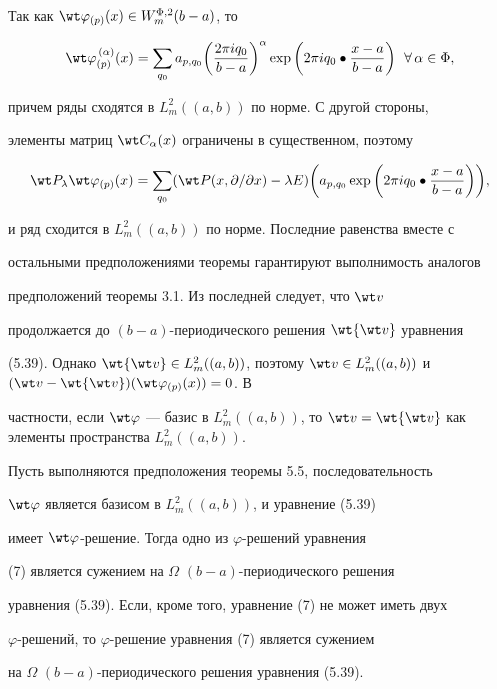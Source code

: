 \begin{pf} 


Так как $\wt\varphi_{(p)}(x)\in W^{\Phi,2}_m(b-a)$, то 


$$ 


\wt\varphi^{\,(\alpha)}_{(p)}(x)=\sum_{q_0} 


a_{p,q_0}\bigg(\frac{2\pi i q_0}{b-a}\bigg)^\alpha\exp\bigg( 


2\pi i q_0\bullet\frac{x-a}{b-a}\bigg)\ \; \forall\,\alpha\in\Phi, 


$$ 


причем ряды сходятся в $L^2_m((a,b))$ по норме. С другой стороны, 


элементы матриц $\wt C_\alpha(x)$ ограничены в существенном, поэтому 


$$ 


\wt P_\lambda\wt\varphi_{(p)}(x)=\sum_{q_0}(\wt P 


(x,\partial/\partial x)-\lambda E)\bigg(a_{p,q_0}\exp\bigg( 


2\pi i q_0\bullet\frac{x-a}{b-a}\bigg)\bigg), 


$$ 


и ряд сходится в $L^2_m((a,b))$ по норме. Последние равенства вместе с 


остальными предположениями теоремы гарантируют выполнимость аналогов 


предположений теоремы 3.1. Из последней следует, что $\wt v$ 


продолжается до $(b{-}a)$-периодического решения $\wt{\wt v}$ уравнения 


(5.39). Однако $\wt{\wt v}\in L^2_m((a,b))$, поэтому $\wt v\in 


L^2_m((a,b))$ и $(\wt v-\wt{\wt v})(\wt\varphi_{(p)}(x))=0$. В 


частности, если $\wt\varphi$ --- базис в $L^2_m((a,b))$, то $\wt 


v=\wt{\wt v}$ как элементы пространства $L^2_m((a,b))$. 


\end{pf} 


 


\begin{cors} 


Пусть выполняются предположения теоремы 5.5, последовательность 


$\wt\varphi$ является базисом в $L^2_m((a,b))$, и уравнение (5.39) 


имеет $\wt\varphi$-решение. Тогда одно из $\varphi$-решений уравнения 


(7) является сужением на $\Omega$\; $(b{-}a)$-периодического решения 


уравнения (5.39). Если, кроме того, уравнение (7) не может иметь двух 


$\varphi$-решений, то $\varphi$-решение уравнения (7) является сужением 


на $\Omega$\; $(b{-}a)$-периодического решения уравнения (5.39). 


\end{cors} 



